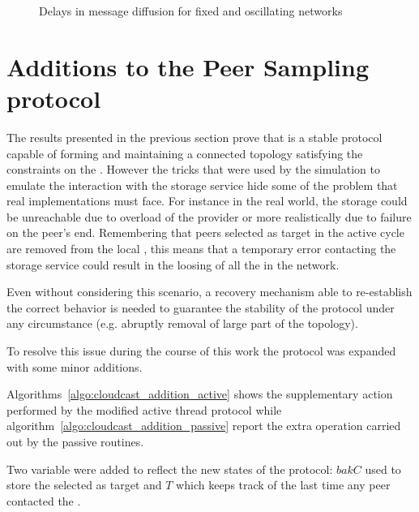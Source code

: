 \begin{figure}[H]
  \centering
  \caption{Delays in message diffusion for fixed and oscillating networks}
  \label{fig:cloudcast-sim-globa-delay}
\end{figure}

\section{Additions to the Peer Sampling protocol}
\label{sec:cloudcast-additions}
The results presented in the previous section prove that
\cloudcast is a stable protocol capable of forming and maintaining a
connected topology satisfying the constraints on the \cloud. However
the tricks that were used by the simulation to emulate the interaction
with the storage service hide some of the problem that real
implementations must face. For instance in the real world, the
\cloud storage could be unreachable due to overload of the provider
or more realistically due to failure on the peer's end. Remembering
that peers selected as target in the active cycle are removed from the
local \view, this means that a temporary error contacting the
storage service could result in the loosing of all the
\cloud \descriptor in the network.

Even without considering this scenario, a recovery mechanism able to
re-establish the correct behavior is needed to guarantee the stability
of the protocol under any circumstance (e.g. abruptly removal of large
part of the topology).

To resolve this issue during the course of this work the
\peersampling protocol was expanded with some minor additions.



Algorithms~\ref{algo:cloudcast_addition_active} shows the
supplementary action performed by the modified \cyclon active thread
protocol while algorithm~\ref{algo:cloudcast_addition_passive} report
the extra operation carried out by the passive routines.

Two variable were added to reflect the new states of the protocol:
$bakC$ used to store the \cloud \descriptor selected as target and
$T$ which keeps track of the last time any peer contacted the \cloud.

